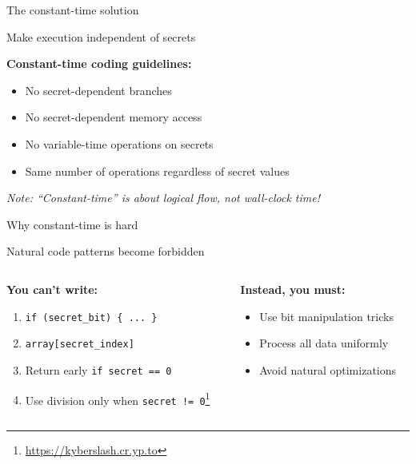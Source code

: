 \documentclass[aspectratio=169, lualatex, handout]{beamer}
\begin{document}
\begin{frame}{The constant-time solution}
	\begin{center}
		\Large
		Make execution independent of secrets
	\end{center}
	\vspace{1em}
	\textbf{Constant-time coding guidelines:}
	\begin{itemize}
		\item No secret-dependent branches
		\item No secret-dependent memory access
		\item No variable-time operations on secrets
		\item Same number of operations regardless of secret values
	\end{itemize}
	\vspace{0.5em}
	\begin{center}
		\textit{Note: ``Constant-time'' is about logical flow, not wall-clock time!}
	\end{center}
\end{frame}

\begin{frame}{Why constant-time is hard}
	\begin{center}
		\Large
		Natural code patterns become forbidden
	\end{center}
	\begin{columns}[t]
		\begin{column}{0.5\textwidth}
			\textbf{You can't write:}
			\begin{enumerate}
				\item \texttt{if (secret\_bit) \{ ... \}}
				\item \texttt{array[secret\_index]}
				\item Return early \texttt{if secret == 0}
				\item Use division only when \texttt{secret != 0}\footnote{\url{https://kyberslash.cr.yp.to}}
			\end{enumerate}
		\end{column}
		\begin{column}{0.5\textwidth}
			\textbf{Instead, you must:}
			\begin{itemize}
				\item Use bit manipulation tricks
				\item Process all data uniformly
				\item Avoid natural optimizations
			\end{itemize}
		\end{column}
	\end{columns}
\end{frame}
\end{document}

